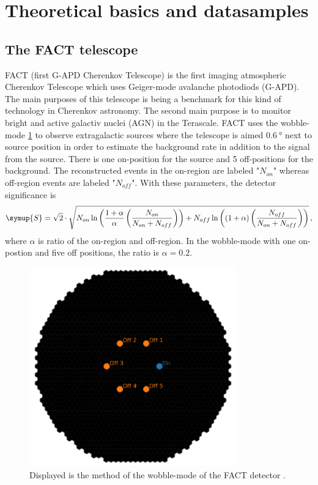 \section{Theoretical basics and datasamples}
\label{sec:theorie}

\subsection{The FACT telescope}
FACT (first G-APD Cherenkov Telescope) is the first imaging atmospheric Cherenkov Telescope which uses Geiger-mode avalanche photodiods (G-APD). 
The main purposes of this telescope is being a benchmark for this kind of technology in Cherenkov astronomy.
The second main purpose is to monitor bright and active galactiv nuclei (AGN) in the Terascale.
FACT uses the wobble-mode \ref{fig:wobble} to observe extragalactic sources where the telescope is aimed $\SI{0.6}{\degree}$ next to 
source position in order to estimate the background rate 
in addition to the signal from the source. There is one on-position for the source and 5 off-positions for the background.
The reconstructed events in the on-region are labeled "$N_{on}$" whereas off-region events are labeled "$N_{off}$".
With these parameters, the detector significance is
\begin{equation*}
  \symup{S} = \sqrt{2}\cdot \sqrt{N_{on} \ln\left( \frac{1 + \alpha}{\alpha} \left(  \frac{N_{on}}{N_{on} + N_{off}}\right)\right) +
  N_{off} \ln\left( (1 + \alpha) \left(\frac{N_{off}}{N_{on} + N_{off}}\right)\right)} \, ,
\end{equation*}
where $\alpha$ is ratio of the on-region and off-region. In the wobble-mode with one on-postion and five off positions, the ratio is $\alpha = 0.2$.

\begin{figure}
  \centering
  \includegraphics[width=0.8\textwidth]{fact_pics/wobblemode.png}
  \caption{Displayed is the method of the wobble-mode of the FACT detector \cite{ANLEITUNG}.}
  \label{fig:wobble}
\end{figure}


